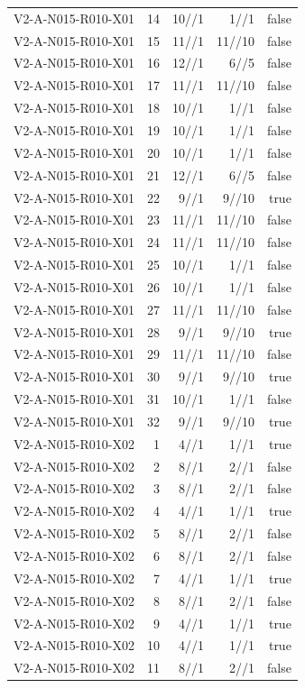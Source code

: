 {\begin{longtable}{lrrrr}
V2-A-N015-R010-X01 & 14 & 10//1 & 1//1 & false \\
V2-A-N015-R010-X01 & 15 & 11//1 & 11//10 & false \\
V2-A-N015-R010-X01 & 16 & 12//1 & 6//5 & false \\
V2-A-N015-R010-X01 & 17 & 11//1 & 11//10 & false \\
V2-A-N015-R010-X01 & 18 & 10//1 & 1//1 & false \\
V2-A-N015-R010-X01 & 19 & 10//1 & 1//1 & false \\
V2-A-N015-R010-X01 & 20 & 10//1 & 1//1 & false \\
V2-A-N015-R010-X01 & 21 & 12//1 & 6//5 & false \\
V2-A-N015-R010-X01 & 22 & 9//1 & 9//10 & true \\
V2-A-N015-R010-X01 & 23 & 11//1 & 11//10 & false \\
V2-A-N015-R010-X01 & 24 & 11//1 & 11//10 & false \\
V2-A-N015-R010-X01 & 25 & 10//1 & 1//1 & false \\
V2-A-N015-R010-X01 & 26 & 10//1 & 1//1 & false \\
V2-A-N015-R010-X01 & 27 & 11//1 & 11//10 & false \\
V2-A-N015-R010-X01 & 28 & 9//1 & 9//10 & true \\
V2-A-N015-R010-X01 & 29 & 11//1 & 11//10 & false \\
V2-A-N015-R010-X01 & 30 & 9//1 & 9//10 & true \\
V2-A-N015-R010-X01 & 31 & 10//1 & 1//1 & false \\
V2-A-N015-R010-X01 & 32 & 9//1 & 9//10 & true \\
V2-A-N015-R010-X02 & 1 & 4//1 & 1//1 & true \\
V2-A-N015-R010-X02 & 2 & 8//1 & 2//1 & false \\
V2-A-N015-R010-X02 & 3 & 8//1 & 2//1 & false \\
V2-A-N015-R010-X02 & 4 & 4//1 & 1//1 & true \\
V2-A-N015-R010-X02 & 5 & 8//1 & 2//1 & false \\
V2-A-N015-R010-X02 & 6 & 8//1 & 2//1 & false \\
V2-A-N015-R010-X02 & 7 & 4//1 & 1//1 & true \\
V2-A-N015-R010-X02 & 8 & 8//1 & 2//1 & false \\
V2-A-N015-R010-X02 & 9 & 4//1 & 1//1 & true \\
V2-A-N015-R010-X02 & 10 & 4//1 & 1//1 & true \\
V2-A-N015-R010-X02 & 11 & 8//1 & 2//1 & false \\

\end{longtable}}
